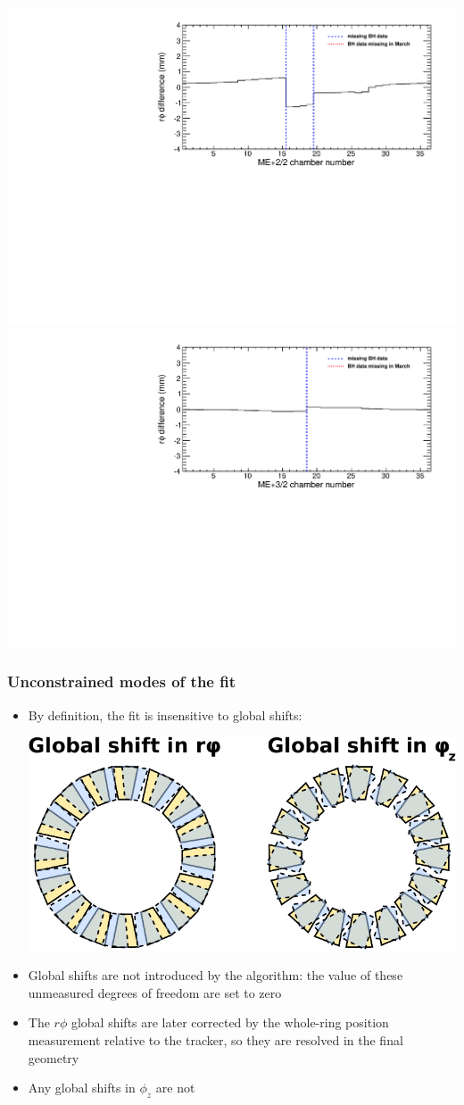 \documentclass[compress]{beamer}
\begin{document}
\begin{frame}
\begin{itemize}
\includegraphics[width=0.5\linewidth]{effectofholes_mep22.pdf}
\includegraphics[width=0.5\linewidth]{effectofholes_mep32.pdf}

\end{itemize}
\end{frame}

\begin{frame}
\frametitle{Unconstrained modes of the fit}

\begin{itemize}
\item By definition, the fit is insensitive to global shifts:
\begin{center}
\includegraphics[width=0.7\linewidth]{global_shifts.pdf}
\end{center}

\item Global shifts are not introduced by the algorithm: the value of
  these unmeasured degrees of freedom are set to zero

\item The $r\phi$ global shifts are later corrected by the whole-ring
  position measurement relative to the tracker, so they are resolved
  in the final geometry

\item Any global shifts in $\phi_z$ are not
\end{itemize}
\end{frame}
\end{document}
